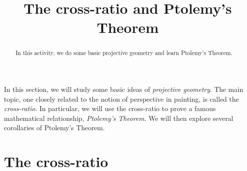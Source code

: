 \documentclass[newpage,hints,handout]{ximera}
\title{The cross-ratio and Ptolemy's Theorem}
\begin{document}
\begin{abstract}
In this activity, we do some basic projective geometry and learn
Ptolemy's Theorem.
\end{abstract}
\maketitle

In this section, we will study some basic ideas of \textit{projective
  geometry}. The main topic, one closely related to the notion of
perspective in painting, is called the \textit{cross-ratio}.  In
particular, we will use the cross-ratio to prove a famous mathematical
relationship, \textit{Ptolemy's Theorem}. We will then explore several
corollaries of Ptolemy's Theorem.



\section{The cross-ratio}
\end{document}
